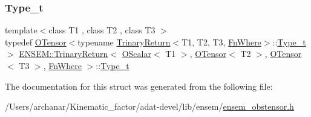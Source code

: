 \subsubsection{\texorpdfstring{Type\_t}{Type\_t}\hspace{0.1cm}{\footnotesize\ttfamily [3/3]}}
{\footnotesize\ttfamily template$<$class T1 , class T2 , class T3 $>$ \\
typedef \mbox{\hyperlink{classENSEM_1_1OTensor}{O\+Tensor}}$<$typename \mbox{\hyperlink{structENSEM_1_1TrinaryReturn}{Trinary\+Return}}$<$T1, T2, T3, \mbox{\hyperlink{structENSEM_1_1FnWhere}{Fn\+Where}}$>$\+::\mbox{\hyperlink{structENSEM_1_1TrinaryReturn_3_01OScalar_3_01T1_01_4_00_01OTensor_3_01T2_01_4_00_01OTensor_3_01T3_01_4_00_01FnWhere_01_4_a02a18159de516aef1fec4c120dcfd91d}{Type\+\_\+t}}$>$ \mbox{\hyperlink{structENSEM_1_1TrinaryReturn}{E\+N\+S\+E\+M\+::\+Trinary\+Return}}$<$ \mbox{\hyperlink{classENSEM_1_1OScalar}{O\+Scalar}}$<$ T1 $>$, \mbox{\hyperlink{classENSEM_1_1OTensor}{O\+Tensor}}$<$ T2 $>$, \mbox{\hyperlink{classENSEM_1_1OTensor}{O\+Tensor}}$<$ T3 $>$, \mbox{\hyperlink{structENSEM_1_1FnWhere}{Fn\+Where}} $>$\+::\mbox{\hyperlink{structENSEM_1_1TrinaryReturn_3_01OScalar_3_01T1_01_4_00_01OTensor_3_01T2_01_4_00_01OTensor_3_01T3_01_4_00_01FnWhere_01_4_a02a18159de516aef1fec4c120dcfd91d}{Type\+\_\+t}}}



The documentation for this struct was generated from the following file\+:\begin{DoxyCompactItemize}
\item 
/\+Users/archanar/\+Kinematic\+\_\+factor/adat-\/devel/lib/ensem/\mbox{\hyperlink{adat-devel_2lib_2ensem_2ensem__obstensor_8h}{ensem\+\_\+obstensor.\+h}}\end{DoxyCompactItemize}

